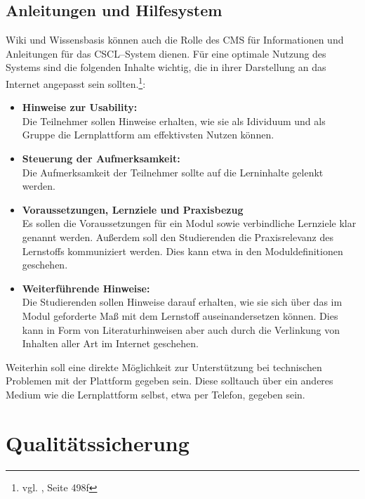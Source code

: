 \subsection{Anleitungen und Hilfesystem} %
\label{sub:anleitungen_und_hilfesystem}
Wiki und Wissensbasis können auch die Rolle des \ac{CMS} für Informationen und Anleitungen für das \ac{CSCL}–System dienen. Für eine optimale Nutzung des Systems sind die folgenden Inhalte wichtig, die in ihrer Darstellung an das Internet angepasst sein sollten.\footnote{vgl. \cite{euler}, Seite 498f}:

\begin{itemize}
	\item \textbf{Hinweise zur Usability:}\\ Die Teilnehmer sollen Hinweise erhalten, wie sie als Idividuum und als Gruppe die Lernplattform am effektivsten Nutzen können.
	\item \textbf{Steuerung der Aufmerksamkeit:}\\ Die Aufmerksamkeit der Teilnehmer sollte auf die Lerninhalte gelenkt werden.
	\item \textbf{Voraussetzungen, Lernziele und Praxisbezug}\\ Es sollen die Voraussetzungen für ein Modul sowie verbindliche Lernziele klar genannt werden. Außerdem soll den Studierenden die Praxisrelevanz des Lernstoffs kommuniziert werden. Dies kann etwa in den Moduldefinitionen geschehen.
	\item \textbf{Weiterführende Hinweise:}\\ Die Studierenden sollen Hinweise darauf erhalten, wie sie sich über das im Modul geforderte Maß mit dem Lernstoff auseinandersetzen können. Dies kann in Form von Literaturhinweisen aber auch durch die Verlinkung von Inhalten aller Art im Internet geschehen.
\end{itemize}

 Weiterhin soll eine direkte Möglichkeit zur Unterstützung bei technischen Problemen mit der Plattform gegeben sein. Diese solltauch über ein anderes Medium wie die Lernplattform selbst, etwa per Telefon, gegeben sein.


\section{Qualitätssicherung} %
\label{sec:qualitatssicherung}

